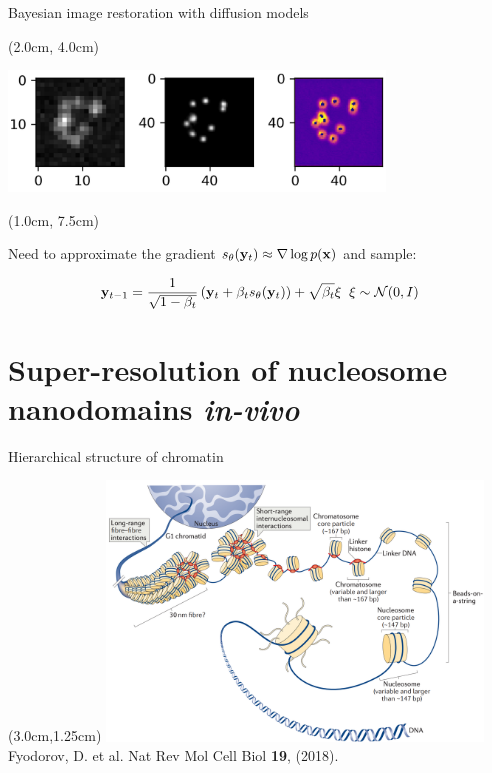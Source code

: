 \documentclass{beamer}					%
\begin{document}
\begin{frame}{Bayesian image restoration with diffusion models}
\begin{textblock*}{10cm}(2.0cm, 4.0cm)

\includegraphics[width=10cm]{media/Bayes.png}
\end{textblock*}

\begin{textblock*}{12cm}(1.0cm, 7.5cm)

Need to approximate the gradient $s_{\theta}(\bold{y}_{t}) \approx \nabla\log p(\bold{x})$ and sample:

\begin{equation*}
\bold{y}_{t-1} = \frac{1}{\sqrt{1-\beta_{t}}}\left(\bold{y}_{t} + \beta_{t}s_{\theta}(\bold{y}_{t})\right) + \sqrt{\beta_{t}}\xi \;\; \xi \sim \mathcal{N}(0,I)
\end{equation*}

\end{textblock*}


\end{frame}


\section{Super-resolution of nucleosome nanodomains \textit{in-vivo}}

\begin{frame}{Hierarchical structure of chromatin}

\begin{textblock*}{10cm}(3.0cm,1.25cm)
\includegraphics[width=10cm]{media/Chromatin}
\\
\vspace{0.4cm}
Fyodorov, D. et al. Nat Rev Mol Cell Biol \textbf{19}, (2018).
\end{textblock*}

\end{frame}
\end{document}
